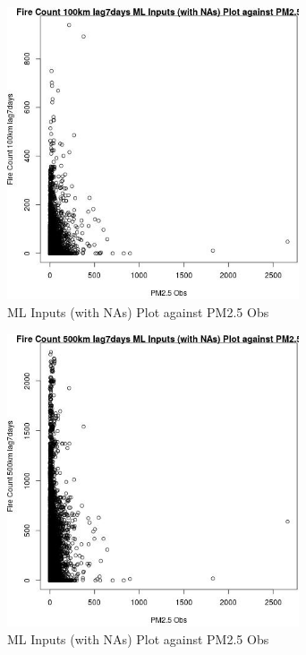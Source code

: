 \begin{figure} 
\centering  
\includegraphics[width=0.77\textwidth]{Code_Outputs/Report_ML_input_PM25_Step4_part_e_de_duplicated_aves_compiled_2019-05-20wNAs_Fire_Count_100km_lag7daysvPM25_Obs.jpg} 
\caption{\label{fig:Report_ML_input_PM25_Step4_part_e_de_duplicated_aves_compiled_2019-05-20wNAsFire_Count_100km_lag7daysvPM25_Obs}ML Inputs (with NAs) Plot against PM2.5 Obs} 
\end{figure} 
 

\begin{figure} 
\centering  
\includegraphics[width=0.77\textwidth]{Code_Outputs/Report_ML_input_PM25_Step4_part_e_de_duplicated_aves_compiled_2019-05-20wNAs_Fire_Count_500km_lag7daysvPM25_Obs.jpg} 
\caption{\label{fig:Report_ML_input_PM25_Step4_part_e_de_duplicated_aves_compiled_2019-05-20wNAsFire_Count_500km_lag7daysvPM25_Obs}ML Inputs (with NAs) Plot against PM2.5 Obs} 
\end{figure} 
 

